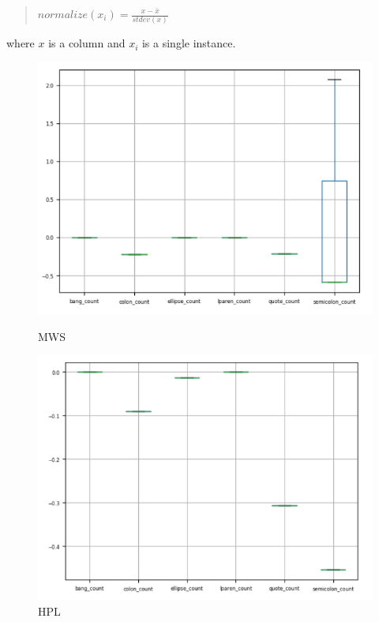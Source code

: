 \documentclass[8pt]{article}
\begin{document}
\begin{quote}
$ normalize(x_i) = \frac{x - \bar{x}}{stdev(x)} $
\end{quote}

where $x$ is a column and $x_i$ is a single instance.
\begin{figure}[h]
  \begin{multicols}{3}
      \includegraphics[width=\linewidth]{images/punc_mws.png}\par\caption{MWS}
      \includegraphics[width=\linewidth]{images/punc_hpl.png}\par\caption{HPL}

\end{multicols}
\end{figure}
\end{document}
